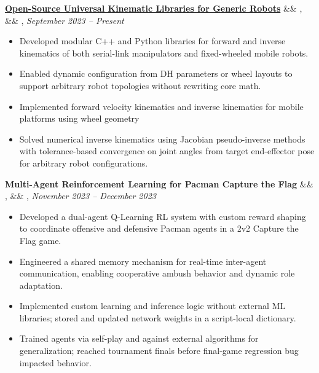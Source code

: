 \documentclass[letterpaper,10pt]{article}
\newcommand{\experience}[5]{%
    \noindent\textbf{#1}%
    \ifx&#2&
    \else
        , \textit{#2}%
    \fi
    \ifx&#3&
    \else
        , #3%
    \fi
    \hfill \textit{#4} \\
    \vspace{-6.8mm}%
    \begin{itemize}[itemsep=-5pt]
        \setlength{\itemindent}{0em}
        #5
    \end{itemize}
    \vspace{1mm}
}
\begin{document}
\experience
    {\href{https://ryanbarry.me/projects/robotics/kinematics/}{Open-Source Universal Kinematic Libraries for Generic Robots}}
    {}
    {}
    {September 2023 – Present}
    {
        \item Developed modular C++ and Python libraries for forward and inverse kinematics of both serial-link manipulators and fixed-wheeled mobile robots.
        \item Enabled dynamic configuration from DH parameters or wheel layouts to support arbitrary robot topologies without rewriting core math.
        \item Implemented forward velocity kinematics and inverse kinematics for mobile platforms using wheel geometry
        \item Solved numerical inverse kinematics using Jacobian pseudo-inverse methods with tolerance-based convergence on joint angles from target end-effector pose for arbitrary robot configurations.
        
    }
    
\experience
    {Multi-Agent Reinforcement Learning for Pacman Capture the Flag}
    {}
    {}
    {November 2023 – December 2023}
    {
        \item Developed a dual-agent Q-Learning RL system with custom reward shaping to coordinate offensive and defensive Pacman agents in a 2v2 Capture the Flag game.
        \item Engineered a shared memory mechanism for real-time inter-agent communication, enabling cooperative ambush behavior and dynamic role adaptation.
        \item Implemented custom learning and inference logic without external ML libraries; stored and updated network weights in a script-local dictionary.
        \item Trained agents via self-play and against external algorithms for generalization; reached tournament finals before final-game regression bug impacted behavior.
    }
\end{document}
